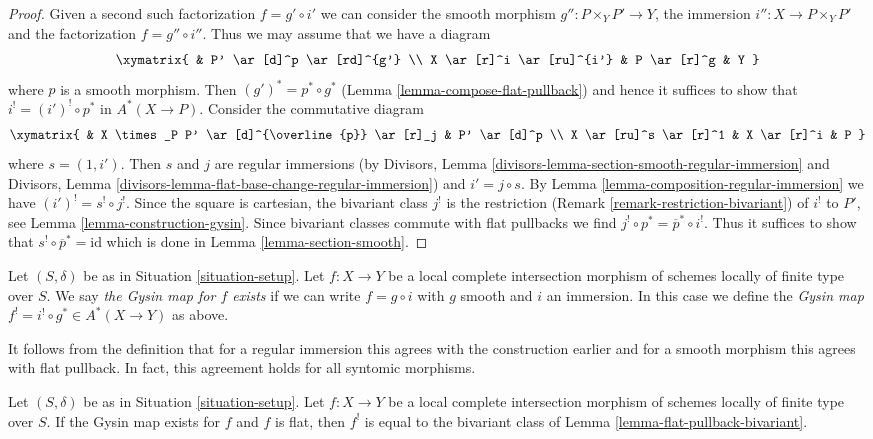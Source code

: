 \begin{proof}
Given a second such factorization $f = g' \circ i'$ we can
consider the smooth morphism $g'' : P \times_Y P' \to Y$, the
immersion $i'' : X \to P \times_Y P'$ and the factorization
$f = g'' \circ i''$. Thus we may assume that we have a diagram
$$
\xymatrix{
& P' \ar[d]^p \ar[rd]^{g'} \\
X \ar[r]^i \ar[ru]^{i'} & P \ar[r]^g & Y
}
$$
where $p$ is a smooth morphism. Then $(g')^* = p^* \circ g^*$
(Lemma \ref{lemma-compose-flat-pullback}) and hence it suffices
to show that $i^! = (i')^! \circ p^*$
in $A^*(X \to P)$. Consider the commutative diagram
$$
\xymatrix{
& X \times_P P' \ar[d]^{\overline{p}} \ar[r]_j & P' \ar[d]^p \\
X \ar[ru]^s \ar[r]^1 & X \ar[r]^i & P
}
$$
where $s =(1, i')$. Then $s$ and $j$ are regular immersions
(by Divisors, Lemma \ref{divisors-lemma-section-smooth-regular-immersion}
and Divisors, Lemma \ref{divisors-lemma-flat-base-change-regular-immersion})
and $i' = j \circ s$. By Lemma \ref{lemma-composition-regular-immersion}
we have $(i')^! = s^! \circ j^!$.
Since the square is cartesian, the bivariant class $j^!$
is the restriction (Remark \ref{remark-restriction-bivariant})
of $i^!$ to $P'$, see Lemma \ref{lemma-construction-gysin}.
Since bivariant classes commute with flat pullbacks
we find $j^! \circ p^* = \overline{p}^* \circ i^!$.
Thus it suffices to show that $s^! \circ \overline{p}^* = \text{id}$
which is done in Lemma \ref{lemma-section-smooth}.
\end{proof}

\begin{definition}
\label{definition-lci-gysin}
Let $(S, \delta)$ be as in Situation \ref{situation-setup}.
Let $f : X \to Y$ be a local complete intersection morphism
of schemes locally of finite type over $S$. We say
{\it the Gysin map for $f$ exists} if we can write
$f = g \circ i$ with $g$ smooth and $i$ an immersion.
In this case we define the
{\it Gysin map} $f^! = i^! \circ g^* \in A^*(X \to Y)$ as above.
\end{definition}

\noindent
It follows from the definition that for a regular immersion
this agrees with the construction earlier and for a smooth
morphism this agrees with flat pullback. In fact, this agreement
holds for all syntomic morphisms.

\begin{lemma}
\label{lemma-lci-gysin-flat}
Let $(S, \delta)$ be as in Situation \ref{situation-setup}.
Let $f : X \to Y$ be a local complete intersection morphism
of schemes locally of finite type over $S$. If the Gysin map
exists for $f$ and $f$ is flat, then $f^!$ is equal to the
bivariant class of Lemma \ref{lemma-flat-pullback-bivariant}.
\end{lemma}

